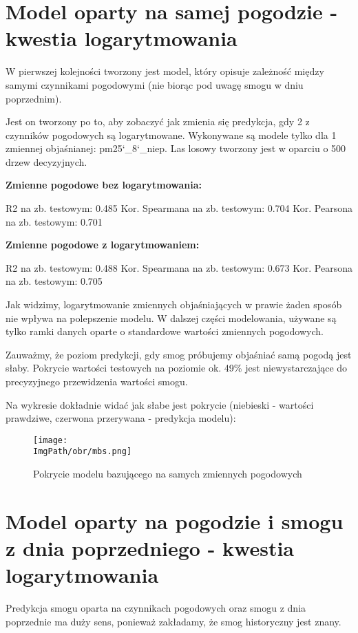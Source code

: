 \documentclass[a4paper,12pt,twoside,openany]{report}
\newcommand{\ImgPath}{.}
\begin{document}
\section{Model oparty na samej pogodzie - kwestia logarytmowania}

W pierwszej kolejności tworzony jest model, który opisuje zależność między samymi czynnikami pogodowymi (nie biorąc pod uwagę smogu w dniu poprzednim).

Jest on tworzony po to, aby zobaczyć jak zmienia się predykcja, gdy 2 z czynników pogodowych są logarytmowane. Wykonywane są modele tylko dla 1 zmiennej objaśnianej: pm25\char`_8\char`_niep. Las losowy tworzony jest w oparciu o 500 drzew decyzyjnych.

\textbf{Zmienne pogodowe bez logarytmowania:}

R2 na zb. testowym: 0.485
Kor. Spearmana na zb. testowym: 0.704
Kor. Pearsona na zb. testowym: 0.701

\textbf{Zmienne pogodowe z logarytmowaniem:}

R2 na zb. testowym: 0.488
Kor. Spearmana na zb. testowym: 0.673
Kor. Pearsona na zb. testowym: 0.705

Jak widzimy, logarytmowanie zmiennych objaśniających w prawie żaden sposób nie wpływa na polepszenie modelu. W dalszej części modelowania, używane są tylko ramki danych oparte o standardowe wartości zmiennych pogodowych.

Zauważmy, że poziom predykcji, gdy smog próbujemy objaśniać samą pogodą jest słaby. Pokrycie wartości testowych na poziomie ok. 49\% jest niewystarczające do precyzyjnego przewidzenia wartości smogu.

Na wykresie dokładnie widać jak słabe jest pokrycie (niebieski - wartości prawdziwe, czerwona przerywana - predykcja modelu):

\begin{figure}[H]
	\begin{center}
		\centering
		\texttt{[image: \\ImgPath/obr/mbs.png]}
	\end{center}
	\caption{Pokrycie modelu bazującego na samych zmiennych pogodowych}
	\label{mbs}
\end{figure}


\section{Model oparty na pogodzie i smogu z dnia poprzedniego - kwestia logarytmowania}

Predykcja smogu oparta na czynnikach pogodowych oraz smogu z dnia poprzednie ma duży sens, ponieważ zakładamy, że smog historyczny jest znany.
\end{document}
